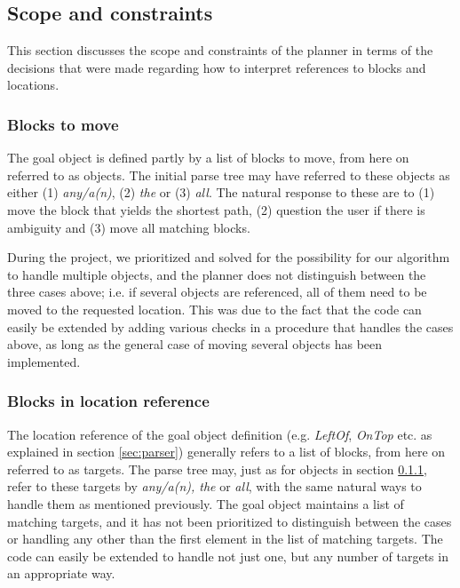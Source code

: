 \subsection{Scope and constraints}

This section discusses the scope and constraints of the planner in terms of the
decisions that were made regarding how to interpret references to blocks and
locations.

\subsubsection{Blocks to move} 
\label{sec:blockstomove}
The goal object is defined partly by a list of blocks to move, from here on
referred to as objects. The initial parse tree may have referred to these
objects as either (1) \textit{any/a(n)}, (2) \textit{the} or (3) \textit{all}.
The natural response to these are to (1) move the block that yields the shortest
path, (2) question the user if there is ambiguity and (3) move all matching
blocks.

During the project, we prioritized and solved for the possibility for our
algorithm to handle multiple objects, and the planner does not distinguish
between the three cases above; i.e. if several objects are referenced, all of
them need to be moved to the requested location. This was due to the fact that
the code can easily be extended by adding various checks in a procedure that
handles the cases above, as long as the general case of moving several objects
has been implemented.

\subsubsection{Blocks in location reference}

The location reference of the goal object definition (e.g. \textit{LeftOf},
\textit{OnTop} etc. as explained in section \ref{sec:parser}) generally
refers to a list of blocks, from here on referred to as targets. The parse tree
may, just as for objects in section \ref{sec:blockstomove}, refer to these
targets by \textit{any/a(n), the} or \textit{all}, with the same natural ways to
handle them as mentioned previously. The goal object maintains a list of
matching targets, and it has not been prioritized to distinguish between the
cases or handling any other than the first element in the list of matching
targets. The code can easily be extended to handle not just one, but any number
of targets in an appropriate way.

